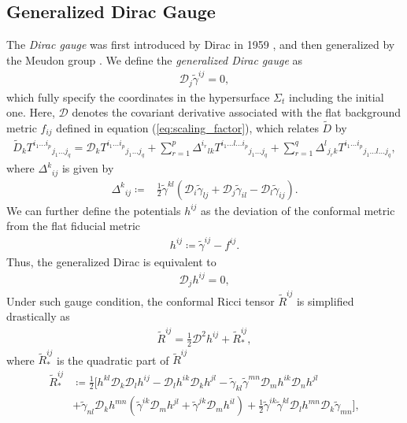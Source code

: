 \subsection{Generalized Dirac Gauge}
\label{section1.4.2}
The \textit{Dirac gauge} was first introduced by Dirac in 1959 \cite{dirac1959fixation},
and then generalized by the Meudon group \cite{bonazzola2004constrained}.
We define the \textit{generalized Dirac gauge} as
\begin{align}\label{eq:dirac_gauge_1}
    \mathcal{D}_j \tilde{\gamma}^{ij} = 0,
\end{align}
which fully specify the coordinates in the hypersurface $\Sigma_t$ including the initial one.
Here, $\mathcal{D}$ denotes the covariant derivative associated with the flat background metric $f_{ij}$ defined in equation (\ref{eq:scaling_factor}),
which relates $\tilde{D}$ by
\begin{align}
    \tilde{D}_k T^{i_1 \dots i_p}{}_{j_1 \dots j_q} = \mathcal{D}_k T^{i_1 \dots i_p}{}_{j_1 \dots j_q} 
    + \sum_{r=1}^p \Delta^{i_r}{}_{lk} T^{i_1 \dots l \dots i_p}{}_{j_1 \dots j_q}
    + \sum_{r=1}^q \Delta^{l}{}_{j_r k} T^{i_1 \dots i_p}{}_{j_1 \dots l \dots j_q},
\end{align}
where $\Delta^{k}{}_{ij}$ is given by
\begin{align}
    \Delta^k{}_{ij} \coloneqq& \frac{1}{2} \tilde{\gamma}^{kl} \left( \mathcal{D}_i \tilde{\gamma}_{lj} + \mathcal{D}_j \tilde{\gamma}_{il}
    - \mathcal{D}_l \tilde{\gamma}_{ij} \right).
\end{align}
We can further define the potentials $h^{ij}$ as the deviation of the conformal metric from the flat fiducial metric
\begin{align}
    h^{ij} \coloneqq \tilde{\gamma}^{ij} - f^{ij}.
\end{align}
Thus, the generalized Dirac is equivalent to
\begin{align}
    \mathcal{D}_j h^{ij} = 0,
\end{align}
Under such gauge condition, the conformal Ricci tensor $\tilde{R}^{ij}$ is simplified drastically as
\begin{align}
    \tilde{R}^{ij} = \frac{1}{2} \mathcal{D}^2 h^{ij} + \tilde{R}^{ij}_{*},
\end{align}
where $\tilde{R}^{ij}_{*}$ is the quadratic part of $\tilde{R}^{ij}$
\begin{align}
    \tilde{R}^{ij}_{*} &\coloneqq \frac{1}{2} \biggl[ h^{kl} \mathcal{D}_k \mathcal{D}_l h^{ij} - \mathcal{D}_l h^{ik} \mathcal{D}_k h^{jl}
    - \tilde{\gamma}_{kl} \tilde{\gamma}^{mn} \mathcal{D}_m h^{ik} \mathcal{D}_n h^{jl} \\
    & + \tilde{\gamma}_{nl} \mathcal{D}_k h^{mn} \left( \tilde{\gamma}^{ik} \mathcal{D}_m h^{jl} + \tilde{\gamma}^{jk} \mathcal{D}_m h^{il} \right)
    + \frac{1}{2} \tilde{\gamma}^{ik} \tilde{\gamma}^{kl} \mathcal{D}_l h^{mn} \mathcal{D}_k \tilde{\gamma}_{mn} \biggr],
\end{align}
